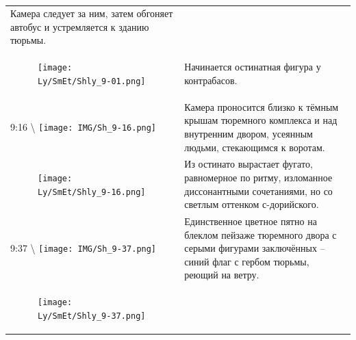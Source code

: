 \begin{longtable}[]{@{}ll@{}}
\begin{minipage}[t]{0.64\columnwidth}
Камера следует за ним, затем обгоняет автобус и
устремляется к зданию тюрьмы.\strut
\end{minipage}\tabularnewline
\begin{minipage}[t]{0.30\columnwidth}\raggedright\strut
\begin{figure}
\centering
\texttt{[image: Ly/SmEt/Shly\_9-01.png]}
\caption{}
\end{figure}
\strut
\end{minipage} & \begin{minipage}[t]{0.64\columnwidth}\raggedright\strut
Начинается остинатная фигура у контрабасов.\strut
\end{minipage}\tabularnewline
\begin{minipage}[t]{0.30\columnwidth}\raggedright\strut
9:16 \textbackslash{}
\texttt{[image: IMG/Sh\_9-16.png]}\strut
\end{minipage} & \begin{minipage}[t]{0.64\columnwidth}\raggedright\strut
Камера проносится близко к тёмным крышам тюремного
комплекса и над внутренним двором, усеянным людьми,
стекающимся к воротам.\strut
\end{minipage}\tabularnewline
\begin{minipage}[t]{0.30\columnwidth}\raggedright\strut
\begin{figure}
\centering
\texttt{[image: Ly/SmEt/Shly\_9-16.png]}
\caption{}
\end{figure}
\strut
\end{minipage} & \begin{minipage}[t]{0.64\columnwidth}\raggedright\strut
Из остинато вырастает фугато, равномерное по ритму,
изломанное диссонантными сочетаниями, но со светлым оттенком
с-дорийского.\strut
\end{minipage}\tabularnewline
\begin{minipage}[t]{0.30\columnwidth}\raggedright\strut
9:37 \textbackslash{}
\texttt{[image: IMG/Sh\_9-37.png]}\strut
\end{minipage} & \begin{minipage}[t]{0.64\columnwidth}\raggedright\strut
Единственное цветное пятно на блеклом пейзаже тюремного
двора с серыми фигурами заключённых -- синий флаг с гербом
тюрьмы, реющий на ветру.\strut
\end{minipage}\tabularnewline
\begin{minipage}[t]{0.30\columnwidth}\raggedright\strut
\begin{figure}
\centering
\texttt{[image: Ly/SmEt/Shly\_9-37.png]}
\caption{}
\end{figure}

\end{minipage}
\end{longtable}
